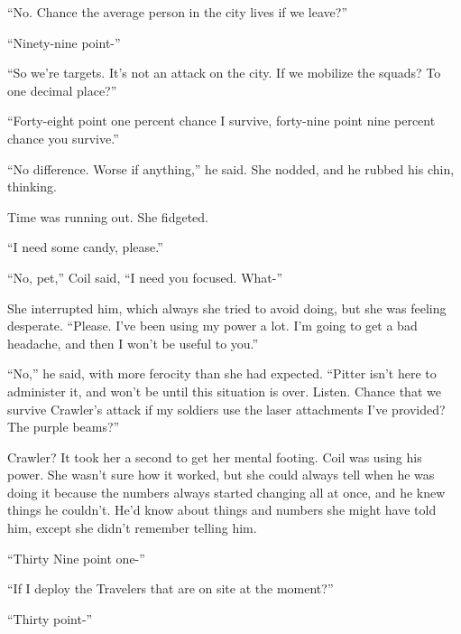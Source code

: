 ``No.  Chance the average person in the city lives if we leave?''



``Ninety-nine point-''



``So we're targets.  It's not an attack on the city.  If we mobilize the squads?  To one decimal place?''



``Forty-eight point one percent chance I survive, forty-nine point nine percent chance you survive.''



``No difference.  Worse if anything,'' he said.  She nodded, and he rubbed his chin, thinking.



Time was running out.  She fidgeted.



``I need some candy, please.''



``No, pet,'' Coil said, ``I need you focused.  What-''



She interrupted him, which always she tried to avoid doing, but she was feeling desperate.  ``Please.  I've been using my power a lot.  I'm going to get a bad headache, and then I won't be useful to you.''



``No,'' he said, with more ferocity than she had expected.  ``Pitter isn't here to administer it, and won't be until this situation is over.  Listen.  Chance that we survive Crawler's attack if my soldiers use the laser attachments I've provided?  The purple beams?''



Crawler?  It took her a second to get her mental footing.  Coil was using his power.  She wasn't sure how it worked, but she could always tell when he was doing it because the numbers always started changing all at once, and he knew things he couldn't.  He'd know about things and numbers she might have told him, except she didn't remember telling him.



``Thirty Nine point one-''



``If I deploy the Travelers that are on site at the moment?''



``Thirty point-''



